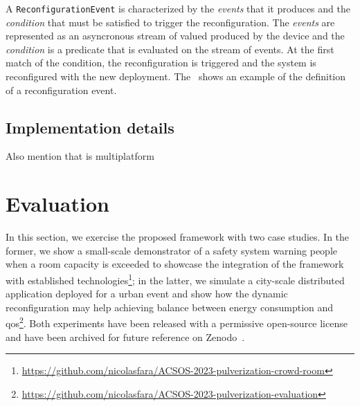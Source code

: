 \documentclass[conference]{IEEEtran}
\begin{document}


A \texttt{ReconfigurationEvent} is characterized by the \emph{events}
that it produces and the \emph{condition} that must be satisfied to trigger the reconfiguration.
%
The \emph{events} are represented as an asyncronous stream of valued produced by the device and the
\emph{condition} is a predicate that is evaluated on the stream of events.
%
At the first match of the condition, the reconfiguration is triggered and the system is reconfigured with the new deployment.
%
The~ shows an example of the definition of a reconfiguration event.



\subsection{Implementation details}

Also mention that is multiplatform

\section{Evaluation}\label{sec:evaluation}

In this section,
we exercise the proposed framework with two case studies.
%
In the former,
we show a small-scale demonstrator of a safety system warning people when a room capacity is exceeded
to showcase the integration of the framework with established technologies\footnote{
    \url{https://github.com/nicolasfara/ACSOS-2023-pulverization-crowd-room}
};
in the latter,
we simulate a city-scale distributed application deployed for a urban event
and show how the dynamic reconfiguration may help achieving balance between energy consumption and \ac{qos}\footnote{
    \url{https://github.com/nicolasfara/ACSOS-2023-pulverization-evaluation}
}.
%
Both experiments have been released with a permissive open-source license and have been archived for future reference on Zenodo~\cite{TBD}.
\end{document}
